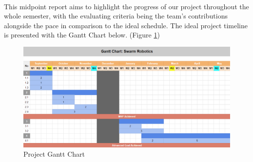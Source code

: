 \paragraph*{}
This midpoint report aims to highlight the progress of our project throughout the whole semester, with the evaluating criteria being the team's contributions alongside the pace in comparison to the ideal schedule. The ideal project timeline is presented with the Gantt Chart below. (Figure \ref{fig:gantt-chart})

\begin{figure} [H]
    \centering
    \includegraphics[width=1\linewidth]{assets/images/introduction/gantt_chart.png}
    \caption{Project Gantt Chart}
    \label{fig:gantt-chart}
\end{figure}

